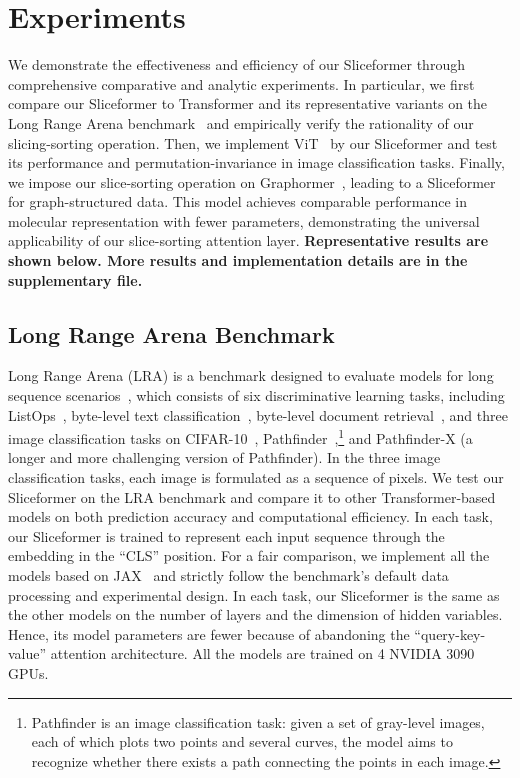 \section{Experiments}\label{sec:exp}
We demonstrate the effectiveness and efficiency of our Sliceformer through comprehensive comparative and analytic experiments. 
In particular, we first compare our Sliceformer to Transformer and its representative variants on the Long Range Arena benchmark~\cite{tay2021long} and empirically verify the rationality of our slicing-sorting operation. 
Then, we implement ViT~\cite{dosovitskiy2021an} by our Sliceformer and test its performance and permutation-invariance in image classification tasks. 
Finally, we impose our slice-sorting operation on Graphormer~\cite{ying2021transformers}, leading to a Sliceformer for graph-structured data. 
This model achieves comparable performance in molecular representation with fewer parameters, demonstrating the universal applicability of our slice-sorting attention layer.
\textbf{Representative results are shown below. More results and implementation details are in the supplementary file. 
}


\subsection{Long Range Arena Benchmark}
Long Range Arena (LRA) is a benchmark designed to evaluate models for long sequence scenarios~\cite{tay2021long}, which consists of six discriminative learning tasks, including ListOps~\cite{nangia2018listops}, byte-level text classification~\cite{maas2011learning}, byte-level document retrieval~\cite{radev2013acl}, and three image classification tasks on CIFAR-10~\cite{krizhevsky2009learning}, Pathfinder~\cite{linsley2018learning},\footnote{Pathfinder is an image classification task: given a set of gray-level images, each of which plots two points and several curves, the model aims to recognize whether there exists a path connecting the points in each image.} and Pathfinder-X (a longer and more challenging version of Pathfinder). 
In the three image classification tasks, each image is formulated as a sequence of pixels.
We test our Sliceformer on the LRA benchmark and compare it to other Transformer-based models on both prediction accuracy and computational efficiency. 
In each task, our Sliceformer is trained to represent each input sequence through the embedding in the ``CLS'' position. 
For a fair comparison, we implement all the models based on JAX~\cite{bradbury2018jax} and strictly follow the benchmark's default data processing and experimental design.
In each task, our Sliceformer is the same as the other models on the number of layers and the dimension of hidden variables. 
Hence, its model parameters are fewer because of abandoning the ``query-key-value'' attention architecture. 
All the models are trained on 4 NVIDIA 3090 GPUs. 




